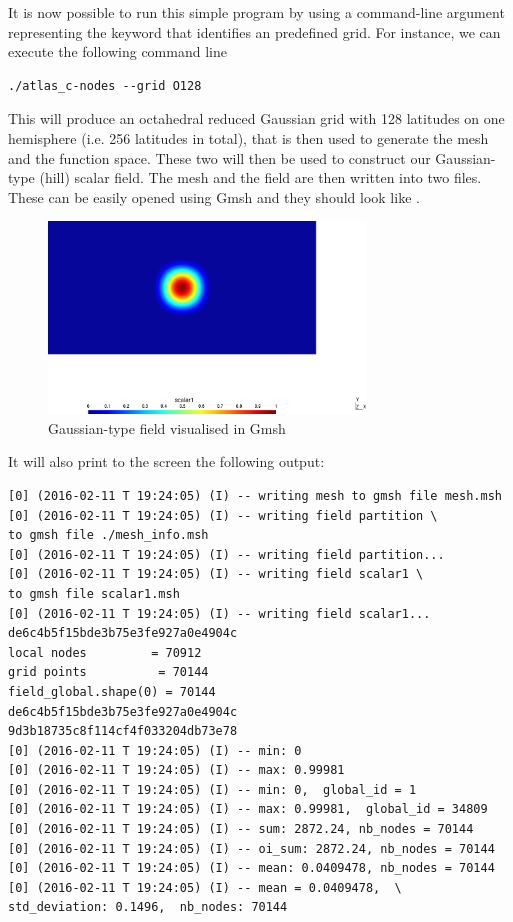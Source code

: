 %
It is now possible to run this simple program by using 
a command-line argument representing the keyword that 
identifies an \Atlas predefined grid.  For instance, 
we can execute the following command line
%
\begin{lstlisting}[style=BashStyle]
./atlas_c-nodes --grid O128
\end{lstlisting}
% 
This will produce an octahedral reduced Gaussian grid 
with 128 latitudes on one hemisphere (i.e. 256 latitudes 
in total), that is then used to generate the mesh and the 
 function space. These two will then be used 
to construct our Gaussian-type (hill) scalar field.
The mesh and the field are then written into two 
files. These can be easily opened using Gmsh and they should 
look like .
%
\begin{figure}%
\centering
\includegraphics[width=0.75\textwidth]{imgs/O128-field.png}
\caption{Gaussian-type field visualised in Gmsh}%
\label{fig:fs_nodes-C}%
\end{figure}
%
It will also print to the screen the following output:
%
\begin{lstlisting}[style=BashStyle]
[0] (2016-02-11 T 19:24:05) (I) -- writing mesh to gmsh file mesh.msh
[0] (2016-02-11 T 19:24:05) (I) -- writing field partition \
to gmsh file ./mesh_info.msh
[0] (2016-02-11 T 19:24:05) (I) -- writing field partition...
[0] (2016-02-11 T 19:24:05) (I) -- writing field scalar1 \
to gmsh file scalar1.msh
[0] (2016-02-11 T 19:24:05) (I) -- writing field scalar1...
de6c4b5f15bde3b75e3fe927a0e4904c
local nodes         = 70912
grid points          = 70144
field_global.shape(0) = 70144
de6c4b5f15bde3b75e3fe927a0e4904c
9d3b18735c8f114cf4f033204db73e78
[0] (2016-02-11 T 19:24:05) (I) -- min: 0
[0] (2016-02-11 T 19:24:05) (I) -- max: 0.99981
[0] (2016-02-11 T 19:24:05) (I) -- min: 0,  global_id = 1
[0] (2016-02-11 T 19:24:05) (I) -- max: 0.99981,  global_id = 34809
[0] (2016-02-11 T 19:24:05) (I) -- sum: 2872.24, nb_nodes = 70144
[0] (2016-02-11 T 19:24:05) (I) -- oi_sum: 2872.24, nb_nodes = 70144
[0] (2016-02-11 T 19:24:05) (I) -- mean: 0.0409478, nb_nodes = 70144
[0] (2016-02-11 T 19:24:05) (I) -- mean = 0.0409478,  \
std_deviation: 0.1496,  nb_nodes: 70144
\end{lstlisting}
